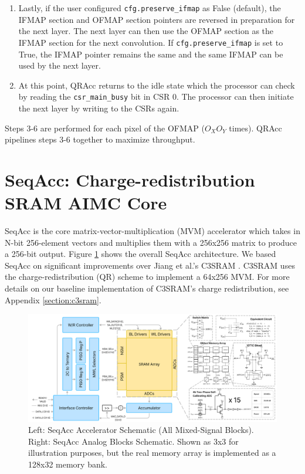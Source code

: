 \begin{enumerate}
    \item Lastly, if the user configured \lstinline{cfg.preserve_ifmap} as False (default), the IFMAP section and OFMAP section pointers are reversed in preparation for the next layer. The next layer can then use the OFMAP section as the IFMAP section for the next convolution. If \lstinline{cfg.preserve_ifmap} is set to True, the IFMAP pointer remains the same and the same IFMAP can be used by the next layer.
    \item At this point, QRAcc returns to the idle state which the processor can check by reading the \lstinline{csr_main_busy} bit in CSR 0. The processor can then initiate the next layer by writing to the CSRs again. 
\end{enumerate}  

Steps 3-6 are performed for each pixel of the OFMAP ($O_XO_Y$ times). QRAcc pipelines steps 3-6 together to maximize throughput.

\section{SeqAcc: Charge-redistribution SRAM AIMC Core}

SeqAcc is the core matrix-vector-multiplication (MVM) accelerator which takes in N-bit 256-element vectors and multiplies them with a 256x256 matrix to produce a 256-bit output. Figure \ref{fig:imc_qrAccSchem} shows the overall SeqAcc architecture. We based SeqAcc on significant improvements over Jiang et al.'s C3SRAM \cite{jiang2020c3sram}. C3SRAM uses the charge-redistribution (QR) scheme to implement a 64x256 MVM. For more details on our baseline implementation of C3SRAM's charge redistribution, see Appendix \ref{section:c3sram}.

\begin{figure}[h]
    \centering
    \includegraphics[width=\linewidth]{images/qracc/imc_seqacc.png}
    \caption{Left: SeqAcc Accelerator Schematic (All Mixed-Signal Blocks). Right: SeqAcc Analog Blocks Schematic. Shown as 3x3 for illustration purposes, but the real memory array is implemented as a 128x32 memory bank.}
    \label{fig:imc_qrAccSchem}
\end{figure}

